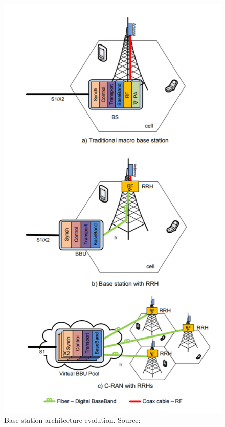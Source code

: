 \documentclass{article}
\begin{document}
\begin{figure}
  \includegraphics[scale=0.5]{res/compare_arc_CRAN.PNG}
    \caption{Base station architecture evolution.
    Source: \parencite{checko14}}
  \label{fig:compare_arc_CRAN}
\end{figure}
\end{document}

